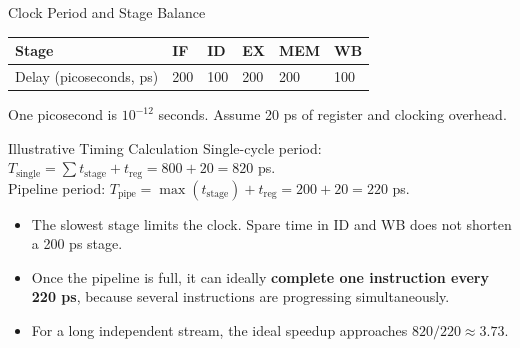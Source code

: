\documentclass[aspectratio=169,11pt,t]{beamer}
\newcommand{\key}[1]{\textbf{#1}}
\begin{document}
\begin{frame}{Clock Period and Stage Balance}
\begin{center}
\small
\renewcommand{\arraystretch}{1.18}
\setlength{\tabcolsep}{5pt}
\begin{tabular}{llllll}
\toprule
\rowcolor{white}
\textbf{Stage} & \textbf{IF} & \textbf{ID} & \textbf{EX} & \textbf{MEM} & \textbf{WB} \\
\midrule
Delay (picoseconds, ps) & 200 & 100 & 200 & 200 & 100 \\
\bottomrule
\end{tabular}
\end{center}

\small One picosecond is $10^{-12}$ seconds. Assume 20 ps of register and clocking overhead.\normalsize
\begin{block}{Illustrative Timing Calculation}
Single-cycle period: $T_{\mathrm{single}} = \sum t_{\mathrm{stage}}+t_{\mathrm{reg}} = 800+20=820$ ps.\\[0.12cm]
Pipeline period: $T_{\mathrm{pipe}} = \max(t_{\mathrm{stage}}) + t_{\mathrm{reg}} = 200+20 = 220$ ps.
\end{block}

\begin{itemize}\setlength{\itemsep}{4pt}
  \item The slowest stage limits the clock. Spare time in ID and WB does not shorten a 200 ps stage.
  \item Once the pipeline is full, it can ideally \key{complete one instruction every 220 ps}, because several instructions are progressing simultaneously.
  \item For a long independent stream, the ideal speedup approaches $820/220 \approx 3.73$.
\end{itemize}

\end{frame}
\end{document}
